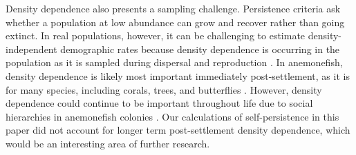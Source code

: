 \documentclass[12pt, oneside]{article}   	%
\begin{document}

Density dependence also presents a sampling challenge. Persistence criteria \citep{hastings_persistence_2006, burgess2014beyond} ask whether a population at low abundance can grow and recover rather than going extinct. In real populations, however, it can be challenging to estimate density-independent demographic rates because density dependence is occurring in the population as it is sampled during dispersal \citep{nowicki2011evidence} and reproduction \citep{rodenhouse2003multiple}. In anemonefish, density dependence is likely most important immediately post-settlement, as it is for many species, including corals, trees, and butterflies \citep{vermeij2008density, harms2000pervasive, nowicki2009relative}. However, density dependence could continue to be important throughout life due to social hierarchies in anemonefish colonies \citep{buston2011determinants}. Our calculations of self-persistence in this paper did not account for longer term post-settlement density dependence, which would be an interesting area of further research.
\end{document}
